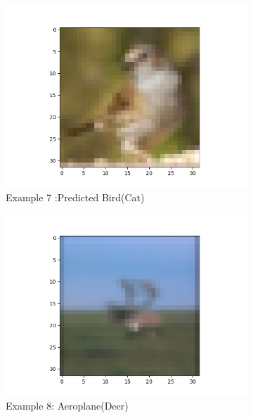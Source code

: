 \documentclass[11pt]{article}
\begin{document}
\begin{figure}[H]
\begin{subfigure}[b]{0.3\textwidth}
        \includegraphics[width=\linewidth]{misB7.png}
        \caption{Example 7 :Predicted Bird(Cat)}
    \end{subfigure}
    \hfill
    \begin{subfigure}[b]{0.3\textwidth}
        \centering
        \includegraphics[width=\linewidth]{misB8.png}
        \caption{Example 8: Aeroplane(Deer)}
    \end{subfigure} 
    \hfill
    \begin{subfigure}[b]{0.3\textwidth}
        \centering

\end{subfigure}
\end{figure}
\end{document}
